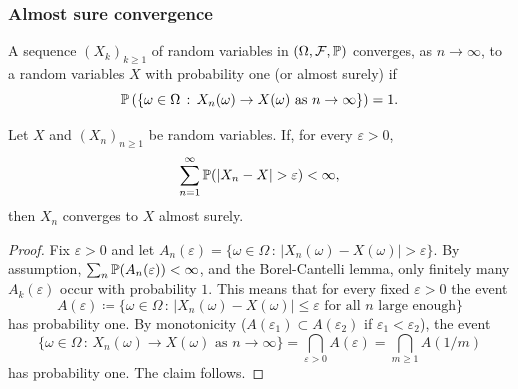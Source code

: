 \documentclass[10pt, a4paper]{article}
\begin{document}
\subsubsection{Almost sure convergence}
\begin{definition}
    A sequence $(X_k)_{k \geq 1}$ of random variables in $(\Omega, \mathcal{F}, \P)$ converges,
    as $n \to \infty$,
    to a random variables $X$ with probability one
    (or almost surely)
    if
    \[
    \P\left(\{\omega \in \Omega\,:\, X_n(\omega) \to X(\omega)\text{ as } n \to \infty\}\right) = 1.
    \]
\end{definition}

\begin{lemma}
    Let $X$ and $(X_n)_{n \geq 1}$ be random variables.
    If,
    for every $\varepsilon > 0$,
    \[
    \sum_{n = 1}^{\infty}\P(|X_n - X| > \varepsilon) < \infty,
    \]
    then $X_n$ converges to $X$ almost surely.

    \begin{proof}
        Fix $\varepsilon > 0$ and let $A_n(\varepsilon) = \{\omega \in \Omega\,:\, |X_n(\omega) - X(\omega)| > \varepsilon\}$.
        By assumption,
        $\sum_{n}\P(A_n(\varepsilon)) < \infty$,
        and the Borel-Cantelli lemma,
        only finitely many $A_k(\varepsilon)$ occur with probability $1$.
        This means that for every fixed $\varepsilon > 0$ the event
        \[
        A(\varepsilon) \coloneqq \{\omega \in \Omega\,:\,|X_n(\omega) - X(\omega)| \leq \varepsilon\text{ for all $n$ large enough}\}
        \]
        has probability one.
        By monotonicity
        ($A(\varepsilon_1) \subset A(\varepsilon_2)$ if $\varepsilon_1 < \varepsilon_2$),
        the event
        \[
        \{\omega \in \Omega\,:\,X_n(\omega) \to X(\omega)\text{ as } n \to \infty\} = \bigcap_{\varepsilon > 0}A(\varepsilon) = \bigcap_{m \geq 1}A(1 / m)
        \]
        has probability one.
        The claim follows.
    \end{proof}
\end{lemma}
\end{document}

